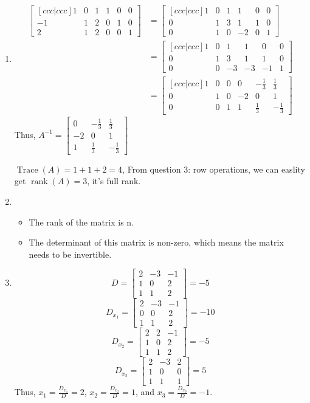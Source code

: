 \documentclass[11pt]{article} %
\begin{document}
\begin{enumerate}
\item 
\begin{align*}
	\begin{bmatrix}[ccc|ccc]
		1&0&1&1&0&0\\
		-1&1&2&0&1&0\\
		2&1&2&0&0&1
	\end{bmatrix}&=\begin{bmatrix}[ccc|ccc]
	1&0&1&1&0&0\\
	0&1&3&1&1&0\\
	0&1&0&-2&0&1
\end{bmatrix}\\
&=\begin{bmatrix}[ccc|ccc]
	1&0&1&1&0&0\\
	0&1&3&1&1&0\\
	0&0&-3&-3&-1&1
\end{bmatrix}\\
&=\begin{bmatrix}[ccc|ccc]
	1&0&0&0&-\frac{1}{3}&\frac{1}{3}\\
	0&1&0&-2&0&1\\
	0&0&1&1&\frac{1}{3}&-\frac{1}{3}
\end{bmatrix}
\end{align*}
Thus, $A^{-1}=\begin{bmatrix}
0&-\frac{1}{3}&\frac{1}{3}\\
-2&0&1\\
1&\frac{1}{3}&-\frac{1}{3}
\end{bmatrix}$

$\operatorname{Trace}{(A)}=1+1+2=4 $, From question 3: row operations,  we can easlity get $\operatorname{rank}{(A)}=3$, it's full rank.

\item 
\begin{itemize}
	\item The rank of the matrix is n.
	\item The determinant of this matrix is non-zero, which means the matrix needs to be invertible. 
\end{itemize}
\item 
$$D=\begin{bmatrix}
	2&-3&-1\\1&0&2\\1&1&2
\end{bmatrix}=-5$$
$$D_{x_1}=\begin{bmatrix}
	2&-3&-1\\0&0&2\\1&1&2
\end{bmatrix}=-10$$
$$D_{x_2}=\begin{bmatrix}
	2&2&-1\\1&0&2\\1&1&2
\end{bmatrix}=-5$$
$$D_{x_3}=\begin{bmatrix}
	2&-3&2\\1&0&0\\1&1&1
\end{bmatrix}=5$$
Thus, $x_1=\frac{D_{x_1}}{D}=2$, $x_2=\frac{D_{x_2}}{D}=1$, and $x_3=\frac{D_{x_3}}{D}=-1$. 
\end{enumerate}
\end{document}
